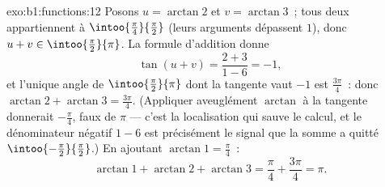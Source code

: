 \begin{solution}{exo:b1:functions:12}
Posons $u = \arctan 2$ et $v = \arctan 3$~; tous deux appartiennent à
$\intoo{\frac\pi4}{\frac\pi2}$ (leurs arguments dépassent $1$), donc
$u + v \in \intoo{\frac\pi2}{\pi}$. La formule d'addition donne
\[
\tan(u + v) = \frac{2 + 3}{1 - 6} = -1 ,
\]
et l'unique angle de $\intoo{\frac\pi2}{\pi}$ dont la tangente vaut
$-1$ est $\frac{3\pi}4$~: donc $\arctan 2 + \arctan 3 =
\frac{3\pi}4$. (Appliquer aveuglément $\arctan$ à la tangente
donnerait $-\frac\pi4$, faux de $\pi$ --- c'est la localisation qui
sauve le calcul, et le dénominateur négatif $1 - 6$ est précisément
le signal que la somme a quitté
$\intoo{-\frac\pi2}{\frac\pi2}$.) En ajoutant $\arctan 1 =
\frac\pi4$~:
\[
\arctan 1 + \arctan 2 + \arctan 3 = \frac\pi4 + \frac{3\pi}4 = \pi .
\]
\end{solution}

